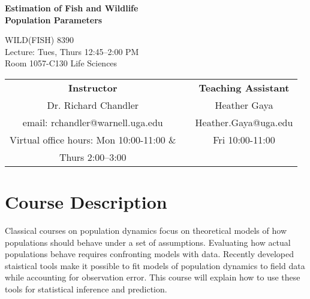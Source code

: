 \documentclass[12pt]{article}
\begin{document}

{\centering

{\Large \bf \sc
  Estimation of Fish and Wildlife \\ Population Parameters \\
}
\vspace{12pt}

WILD(FISH) 8390  \\
Lecture: Tues, Thurs 12:45--2:00 PM \\
Room 1057-C130 Life Sciences \\


\normalsize

\vspace{24pt}

\begin{tabular}[h!]{ccc}
\textbf{Instructor}                 & \hspace{0.01cm} & \textbf{Teaching Assistant} \\
Dr. Richard Chandler                & & Heather Gaya\\
email: rchandler@warnell.uga.edu    & & Heather.Gaya@uga.edu \\
Virtual office hours: Mon 10:00-11:00 \&  & & Fri 10:00-11:00 \\
   Thurs 2:00--3:00 & & \\
\end{tabular}


}



\normalsize


\vspace{-2mm}
\section*{\normalsize Course Description}
\vspace{-4mm}
Classical courses on population dynamics focus on theoretical models 
of how populations should behave under a set of assumptions.
Evaluating how actual populations behave requires confronting models
with data. Recently developed staistical tools make it possible to fit
models of population dynamics to field data while accounting for
observation error. This course will explain how to use these tools for
statistical inference and prediction.  
\end{document}
